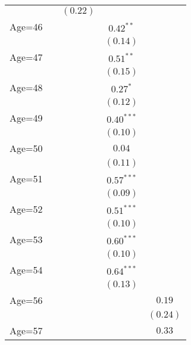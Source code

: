 \documentclass[fullpage]{paper}
\begin{document}
\begin{center}
\begin{longtable}{l c c c c }
            &               & $(0.22)$      &               &               \\
Age=46      &               &               & $0.42^{**}$   &               \\
            &               &               & $(0.14)$      &               \\
Age=47      &               &               & $0.51^{**}$   &               \\
            &               &               & $(0.15)$      &               \\
Age=48      &               &               & $0.27^{*}$    &               \\
            &               &               & $(0.12)$      &               \\
Age=49      &               &               & $0.40^{***}$  &               \\
            &               &               & $(0.10)$      &               \\
Age=50      &               &               & $0.04$        &               \\
            &               &               & $(0.11)$      &               \\
Age=51      &               &               & $0.57^{***}$  &               \\
            &               &               & $(0.09)$      &               \\
Age=52      &               &               & $0.51^{***}$  &               \\
            &               &               & $(0.10)$      &               \\
Age=53      &               &               & $0.60^{***}$  &               \\
            &               &               & $(0.10)$      &               \\
Age=54      &               &               & $0.64^{***}$  &               \\
            &               &               & $(0.13)$      &               \\
Age=56      &               &               &               & $0.19$        \\
            &               &               &               & $(0.24)$      \\
Age=57      &               &               &               & $0.33$        \\

\end{longtable}
\end{center}
\end{document}
